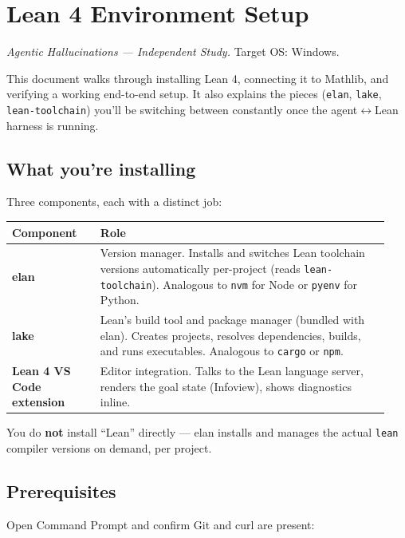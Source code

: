 \chapter{Lean 4 Environment Setup}
\label{ch:environment}

\emph{Agentic Hallucinations --- Independent Study.} Target OS: Windows.

This document walks through installing Lean 4, connecting it to Mathlib, and verifying a working end-to-end setup. It also explains the pieces (\texttt{elan}, \texttt{lake}, \texttt{lean-toolchain}) you'll be switching between constantly once the agent\(\leftrightarrow\)Lean harness is running.

\section{What you're installing}

Three components, each with a distinct job:

\begin{center}
\begin{tabular}{@{}p{0.22\linewidth}p{0.72\linewidth}@{}}
\hline
\textbf{Component} & \textbf{Role} \\
\hline
\textbf{elan} & Version manager. Installs and switches Lean toolchain versions automatically per-project (reads \texttt{lean-toolchain}). Analogous to \texttt{nvm} for Node or \texttt{pyenv} for Python. \\
\textbf{lake} & Lean's build tool and package manager (bundled with elan). Creates projects, resolves dependencies, builds, and runs executables. Analogous to \texttt{cargo} or \texttt{npm}. \\
\textbf{Lean 4 VS Code extension} & Editor integration. Talks to the Lean language server, renders the goal state (Infoview), shows diagnostics inline. \\
\hline
\end{tabular}
\end{center}

You do \textbf{not} install ``Lean'' directly --- elan installs and manages the actual \texttt{lean} compiler versions on demand, per project.

\section{Prerequisites}

Open Command Prompt and confirm Git and curl are present:

